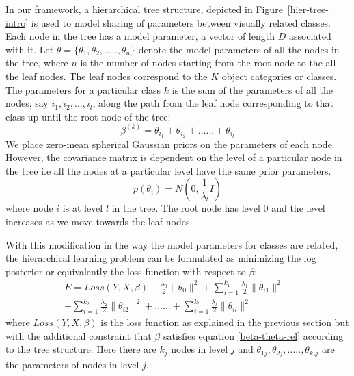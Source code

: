 \documentclass[10pt,twocolumn,letterpaper]{article}
\begin{document}
In our framework, a hierarchical tree structure, depicted in Figure~\ref{hier-tree-intro} is used to model sharing of parameters between 
visually related classes. Each node in the tree has a model parameter, a vector of length $D$ 
associated with it.  Let $ \theta = \{ \theta_{1}, \theta_{2},.....,\theta_{n}\} $ denote the model parameters 
of all the nodes in the tree, where $n$ is the number of nodes starting from the root node to the all the leaf nodes.
The leaf nodes correspond to the $K$ object categories or classes. The parameters for a particular class $k$
is the sum of the parameters of all the nodes, say $i_{1}, i_{2}, ..., i_{l} $, along the path from the leaf node
corresponding to that class up until the root node of the tree:
\begin{equation} \label{beta-theta-rel}
  \beta^{(k)} = \theta_{i_{1}} +  \theta_{i_{2}} + ...... + \theta_{i_{l}}
\end{equation} 
We place zero-mean spherical Gaussian priors on the parameters of each node. However, the 
covariance matrix is dependent on the level of a particular node in the tree i.e all the nodes at
a particular level have the same prior parameters.
\begin{equation}
  p(\theta_{i})  = N(0,\frac{1}{\lambda_{l}}I) 
\end{equation}   
where node $i$ is at level $l$ in the tree. The root node has level 0 and the level increases as 
we move towards the leaf nodes.

With this modification in the way the model parameters for classes are related,  the hierarchical 
learning problem can be formulated as minimizing the log posterior or equivalently the loss function 
with respect to $\beta$:
\begin{equation} \label{hier-loss}
  \begin{split}
    E = Loss(Y,X,\beta) + \frac{\lambda_{0}}{2} \|\theta_{0} \|^{2} +
    \sum_{i=1}^{k_{1}} \frac{\lambda_{1}}{2} \|\theta_{i1} \|^{2} & \\
    + \sum_{i=1}^{k_{2}} \frac{\lambda_{2}}{2} \|\theta_{i2} \|^{2} +
    ...... +
    \sum_{i=1}^{k_{l}} \frac{\lambda_{l}}{2} \|\theta_{il} \|^{2} &
  \end{split}
\end{equation} 
 where $Loss(Y,X,\beta)$ is the loss function as explained in the previous section
 but with the additional constraint that $\beta$ satisfies  equation \ref{beta-theta-rel} 
 according to the tree structure. Here there are $k_{j}$ nodes in level $j$ and 
 $\theta_{1j}, \theta_{2j},.....,\theta_{k_{j}j}$ are the parameters of nodes in level $j$.
\end{document}
